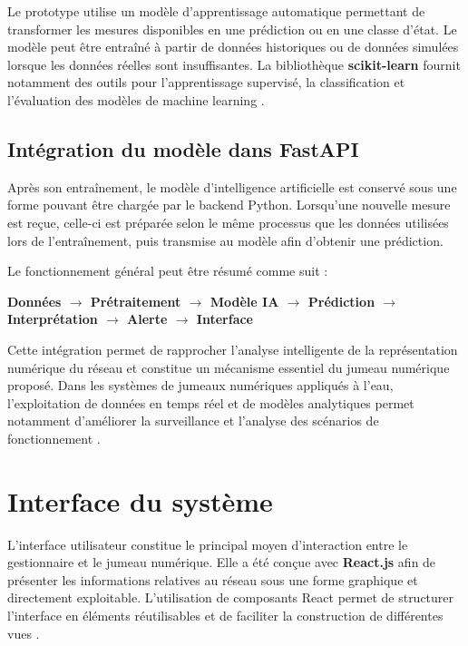 Le prototype utilise un modèle d'apprentissage automatique permettant
de transformer les mesures disponibles en une prédiction ou en une
classe d'état. Le modèle peut être entraîné à partir de données
historiques ou de données simulées lorsque les données réelles sont
insuffisantes. La bibliothèque \textbf{scikit-learn} fournit notamment
des outils pour l'apprentissage supervisé, la classification et
l'évaluation des modèles de machine learning \cite{ref120}.

\subsection{Intégration du modèle dans FastAPI}

Après son entraînement, le modèle d'intelligence artificielle est
conservé sous une forme pouvant être chargée par le backend Python.
Lorsqu'une nouvelle mesure est reçue, celle-ci est préparée selon le
même processus que les données utilisées lors de l'entraînement, puis
transmise au modèle afin d'obtenir une prédiction.

Le fonctionnement général peut être résumé comme suit :

\begin{center}
	\textbf{Données $\rightarrow$ Prétraitement $\rightarrow$ Modèle IA
		$\rightarrow$ Prédiction $\rightarrow$ Interprétation $\rightarrow$
		Alerte $\rightarrow$ Interface}
\end{center}

Cette intégration permet de rapprocher l'analyse intelligente de la
représentation numérique du réseau et constitue un mécanisme essentiel
du jumeau numérique proposé. Dans les systèmes de jumeaux numériques
appliqués à l'eau, l'exploitation de données en temps réel et de modèles
analytiques permet notamment d'améliorer la surveillance et l'analyse
des scénarios de fonctionnement \cite{ref134}.

\section{Interface du système}

L'interface utilisateur constitue le principal moyen d'interaction
entre le gestionnaire et le jumeau numérique. Elle a été conçue avec
\textbf{React.js} afin de présenter les informations relatives au réseau
sous une forme graphique et directement exploitable. L'utilisation de
composants React permet de structurer l'interface en éléments
réutilisables et de faciliter la construction de différentes vues
\cite{ref128}.

